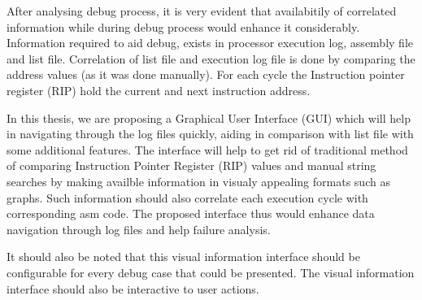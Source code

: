 After analysing debug process, it is very evident that availabitily of correlated information while during debug process would enhance it considerably. Information required to aid debug, exists in processor execution log, assembly file and list file. Correlation of list file and execution log file is done by comparing the address values (as it was done manually). For each cycle the Instruction pointer register (RIP) hold the current and next instruction address.

In this thesis, we are proposing a Graphical User Interface (GUI) which will help in navigating through the log files quickly, aiding in comparison with list file with some additional features. The interface will help to get rid of traditional method of comparing Instruction Pointer Register (RIP) values and manual string searches by making availble information in visualy appealing formats such as graphs. Such information should also correlate each execution cycle with corresponding asm code. The proposed interface thus would enhance data navigation through log files and help failure analysis.

It should also be noted that this visual information interface should be configurable for every debug case that could be presented. The visual information interface should also be interactive to user actions.



